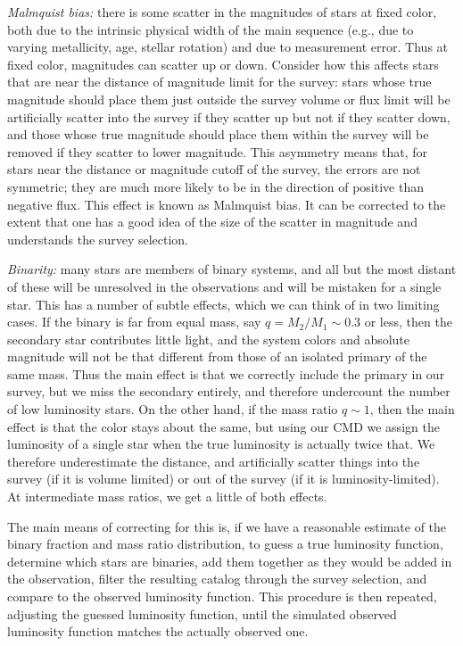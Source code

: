 \textit{Malmquist bias:} there is some scatter in the magnitudes of stars at fixed color, both due to the intrinsic physical width of the main sequence (e.g., due to varying metallicity, age, stellar rotation) and due to measurement error. Thus at fixed color, magnitudes can scatter up or down. Consider how this affects stars that are near the distance of magnitude limit for the survey: stars whose true magnitude should place them just outside the survey volume or flux limit will be artificially scatter into the survey if they scatter up but not if they scatter down, and those whose true magnitude should place them within the survey will be removed if they scatter to lower magnitude. This asymmetry means that, for stars near the distance or magnitude cutoff of the survey, the errors are not symmetric; they are much more likely to be in the direction of positive than negative flux. This effect is known as Malmquist bias. It can be corrected to the extent that one has a good idea of the size of the scatter in magnitude and understands the survey selection.

\textit{Binarity:} many stars are members of binary systems, and all but the most distant of these will be unresolved in the observations and will be mistaken for a single star. This has a number of subtle effects, which we can think of in two limiting cases. If the binary is far from equal mass, say $q = M_2/M_1 \sim 0.3$ or less, then the secondary star contributes little light, and the system colors and absolute magnitude will not be that different from those of an isolated primary of the same mass. Thus the main effect is that we correctly include the primary in our survey, but we miss the secondary entirely, and therefore undercount the number of low luminosity stars. On the other hand, if the mass ratio $q\sim 1$, then the main effect is that the color stays about the same, but using our CMD we assign the luminosity of a single star when the true luminosity is actually twice that. We therefore underestimate the distance, and artificially scatter things into the survey (if it is volume limited) or out of the survey (if it is luminosity-limited). At intermediate mass ratios, we get a little of both effects.

The main means of correcting for this is, if we have a reasonable estimate of the binary fraction and mass ratio distribution, to guess a true luminosity function, determine which stars are binaries, add them together as they would be added in the observation, filter the resulting catalog through the survey selection, and compare to the observed luminosity function. This procedure is then repeated, adjusting the guessed luminosity function, until the simulated observed luminosity function matches the actually observed one. 

